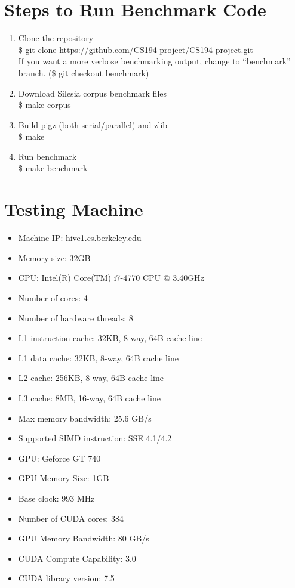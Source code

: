 \section{Steps to Run Benchmark Code}
\begin{enumerate}
  \item Clone the repository\\
    {\color{blue}\$ git clone https://github.com/CS194-project/CS194-project.git}\\
    If you want a more verbose benchmarking output, change to ``benchmark'' branch. ({\color{blue}\$ git checkout benchmark})
  \item Download Silesia corpus benchmark files\\
    {\color{blue}\$ make corpus}\\
  \item Build pigz (both serial/parallel) and zlib\\
    {\color{blue}\$ make}\\    
  \item Run benchmark\\
    {\color{blue}\$ make benchmark}\\
\end{enumerate}
\section{Testing Machine}

\begin{itemize}
\item Machine IP: hive1.cs.berkeley.edu
\item Memory size: 32GB
\item CPU: Intel(R) Core(TM) i7-4770 CPU @ 3.40GHz
\item Number of cores: 4
\item Number of hardware threads: 8
\item L1 instruction cache: 32KB, 8-way, 64B cache line
\item L1 data cache: 32KB, 8-way, 64B cache line
\item L2 cache: 256KB, 8-way, 64B cache line
\item L3 cache: 8MB, 16-way, 64B cache line
\item Max memory bandwidth: 25.6 GB/s
\item Supported SIMD instruction: SSE 4.1/4.2
\item GPU: Geforce GT 740
\item GPU Memory Size: 1GB
\item Base clock: 993 MHz
\item Number of CUDA cores: 384
\item GPU Memory Bandwidth: 80 GB/s
\item CUDA Compute Capability: 3.0
\item CUDA library version: 7.5
\end{itemize}

